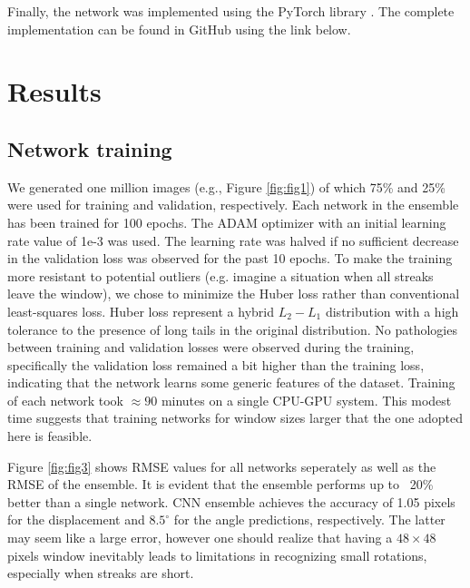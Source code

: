\documentclass{svjour3}                     %
\begin{document}
Finally, the network was implemented using the PyTorch library \cite{paszke2017automatic}. The complete implementation can be found in GitHub using the link below.

\section{Results}

\subsection{Network training}

We generated one million images (e.g., Figure \ref{fig:fig1}) of which 75\% and 25\% were used for training and validation, respectively. Each network in the ensemble has been trained for 100 epochs. The ADAM optimizer with an initial learning rate value of 1e-3 was used. The learning rate was halved if no sufficient decrease in the validation loss was observed for the past 10 epochs. To make the training more resistant to potential outliers (e.g. imagine a situation when all streaks leave the window), we chose to minimize the Huber loss \cite{huber1973robust} rather than conventional least-squares loss. Huber loss represent a hybrid $L_2-L_1$ distribution with a high tolerance to the presence of long tails in the original distribution. 
No pathologies between training and validation losses were observed during the training, specifically the validation loss remained a bit higher than the training loss, indicating that the network learns some generic features of the dataset. Training of each network took $\approx 90$ minutes on a single CPU-GPU system. This modest time suggests that training networks for window sizes larger that the one adopted here is feasible. 

Figure \ref{fig:fig3} shows RMSE values for all networks seperately as well as the RMSE of the ensemble. It is evident that the ensemble performs up to ~20\% better than a single network. CNN ensemble achieves the accuracy of 1.05 pixels for the displacement and $8.5^{\circ}$ for the angle predictions, respectively. The latter may seem like a large error, however one should realize that having a $48 \times 48$ pixels window inevitably leads to limitations in recognizing small rotations, especially when streaks are short. 
\end{document}
